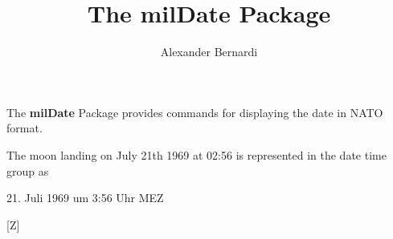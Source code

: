 \documentclass{scrarticle}
\title{\textnormal{The \textbf{milDate} Package}}
\author{Alexander Bernardi}
\begin{document}
\maketitle

The \textbf{milDate} Package provides commands for displaying the date in NATO format.\par
The moon landing on July 21th 1969 at 02:56 is represented in the date time group as
\par\begin{center}
\end{center}\par

 21. Juli 1969 um 3:56 Uhr MEZ
\par
{}[Z]\par
{}
\end{document}
